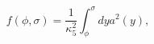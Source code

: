 \begin{equation}
f(\phi,\sigma) = \frac{1}{\kappa_5^2} \int^{\sigma}_{\phi} dy a^2 (y),
\end{equation}

